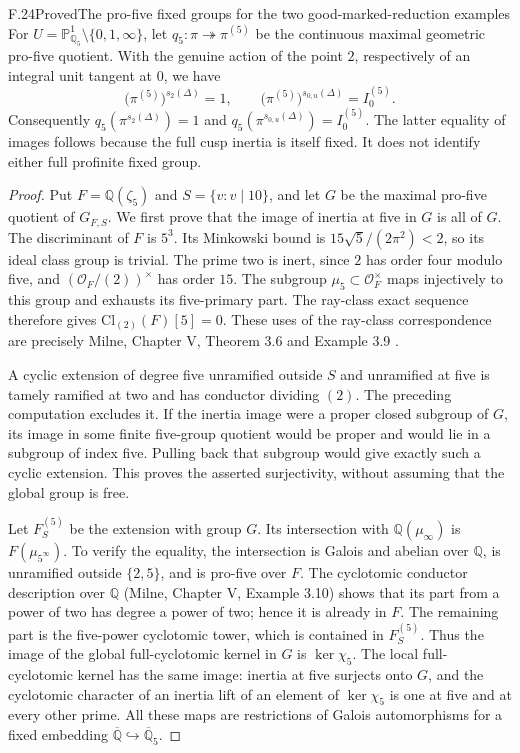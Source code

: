 \begin{statement}{F.24}{Proved}{The pro-five fixed groups for the two good-marked-reduction examples}
For $U=\mathbb P^1_{\mathbb Q_5}\setminus\{0,1,\infty\}$,
let $q_5:\pi\twoheadrightarrow\pi^{(5)}$ be the continuous
maximal geometric pro-five quotient.  With the genuine action
of the point $2$, respectively of an integral unit tangent at
$0$, we have
\[
 \bigl(\pi^{(5)}\bigr)^{s_2(\Delta)}=1,
 \qquad
 \bigl(\pi^{(5)}\bigr)^{s_{0,u}(\Delta)}=I_0^{(5)}.
                                                               \tag{F.24.1}
\]
Consequently $q_5(\pi^{s_2(\Delta)})=1$ and
$q_5(\pi^{s_{0,u}(\Delta)})=I_0^{(5)}$.
The latter equality of images follows because the full cusp
inertia is itself fixed.  It does not identify either full
profinite fixed group.
\end{statement}
\begin{proof}
Put $F=\mathbb Q(\zeta_5)$ and $S=\{v:v\mid10\}$, and let
$G$ be the maximal pro-five quotient of $G_{F,S}$.
We first prove that the image of inertia at five in $G$ is all
of $G$.  The discriminant of $F$ is $5^3$.  Its Minkowski
bound is $15\sqrt5/(2\pi^2)<2$, so its ideal class group is
trivial.  The prime two is inert, since $2$ has order four
modulo five, and $(\mathcal O_F/(2))^\times$ has order $15$.
The subgroup $\mu_5\subset\mathcal O_F^\times$ maps injectively
to this group and exhausts its five-primary part.
The ray-class exact sequence therefore gives
$\mathrm{Cl}_{(2)}(F)[5]=0$.
These uses of the ray-class correspondence are precisely
Milne, Chapter V, Theorem 3.6 and Example 3.9
\cite{BC_MilneCFT2020}.

A cyclic extension of degree five unramified outside $S$ and
unramified at five is tamely ramified at two and has conductor
dividing $(2)$.  The preceding computation excludes it.
If the inertia image were a proper closed subgroup of $G$,
its image in some finite five-group quotient would be proper
and would lie in a subgroup of index five.  Pulling back that
subgroup would give exactly such a cyclic extension.  This
proves the asserted surjectivity, without assuming that the
global group is free.

Let $F_S^{(5)}$ be the extension with group $G$.
Its intersection with $\mathbb Q(\mu_\infty)$ is
$F(\mu_{5^\infty})$.  To verify the equality, the intersection
is Galois and abelian over $\mathbb Q$, is unramified outside
$\{2,5\}$, and is pro-five over $F$.  The cyclotomic conductor
description over $\mathbb Q$ (Milne, Chapter V, Example 3.10)
shows that its part from a power of two has degree a power of
two; hence it is already in $F$.  The remaining part is the
five-power cyclotomic tower, which is contained in
$F_S^{(5)}$.  Thus the image of the global full-cyclotomic
kernel in $G$ is $\ker\chi_5$.
The local full-cyclotomic kernel has the same image: inertia
at five surjects onto $G$, and the cyclotomic character of an
inertia lift of an element of $\ker\chi_5$ is one at five and
at every other prime.  All these maps are restrictions of
Galois automorphisms for a fixed embedding
$\overline{\mathbb Q}\hookrightarrow\overline{\mathbb Q}_5$.


\end{proof}
